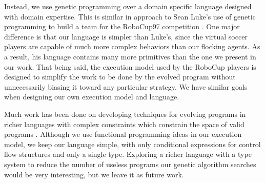Instead, we use genetic programming over a domain specific language designed
with domain expertise.
This is similar in approach to Sean Luke's use of genetic programming to build
a team for the RoboCup97 competition \cite{lukeRoboCup97}.
One major difference is that our language is simpler than Luke's, since the
virtual soccer players are capable of much more complex behaviors than our
flocking agents.
As a result, his language contains many more primitives than the one we
present in our work.
That being said, the execution model used by the RoboCup players is designed to
simplify the work to be done by the evolved program without unnecessarily
biasing it toward any particular strategy.
We have similar goals when designing our own execution model and language.

Much work has been done on developing techniques for evolving programs in
richer languages with complex constraints which constrain the space of valid
programs \cite{BriggsGP}.
Although we use functional programming ideas in our execution model, we keep
our language simple, with only conditional expressions for control flow
structures and only a single type.
Exploring a richer language with a type system to reduce the number of useless
programs our genetic algorithm searches would be very interesting, but we leave
it as future work.

